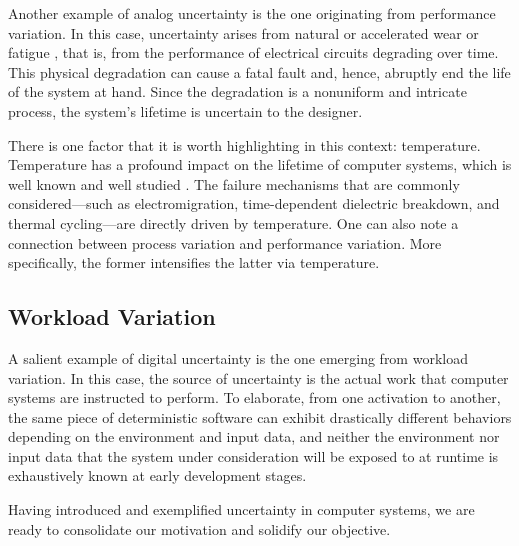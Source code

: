 Another example of analog uncertainty is the one originating from performance
variation. In this case, uncertainty arises from natural or accelerated wear or
fatigue \cite{jedec2016}, that is, from the performance of electrical circuits
degrading over time. This physical degradation can cause a fatal fault and,
hence, abruptly end the life of the system at hand. Since the degradation is a
nonuniform and intricate process, the system's lifetime is uncertain to the
designer.

There is one factor that it is worth highlighting in this context: temperature.
Temperature has a profound impact on the lifetime of computer systems, which is
well known and well studied \cite{jedec2016}. The failure mechanisms that are
commonly considered---such as electromigration, time-dependent dielectric
breakdown, and thermal cycling---are directly driven by temperature. One can
also note a connection between process variation and performance variation. More
specifically, the former intensifies the latter via temperature.

\subsection{Workload Variation}

A salient example of digital uncertainty is the one emerging from workload
variation. In this case, the source of uncertainty is the actual work that
computer systems are instructed to perform. To elaborate, from one activation to
another, the same piece of deterministic software can exhibit drastically
different behaviors depending on the environment and input data, and neither the
environment nor input data that the system under consideration will be exposed
to at runtime is exhaustively known at early development stages.

\conclusioncut
Having introduced and exemplified uncertainty in computer systems, we are ready
to consolidate our motivation and solidify our objective.
